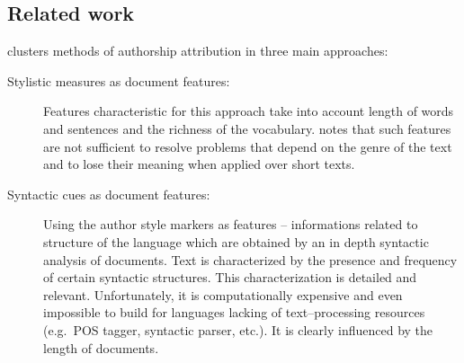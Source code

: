 \documentclass[11pt,english]{article}
\newcommand{\engl}[1]{(engl.~\emph{#1})}
\begin{document}
\begin{multicols}{2}
\section{Related work}
\citet{coyotl2006authorship} clusters methods of authorship attribution in
three main approaches:
\begin{description}
\item[Stylistic measures as document features:] Features characteristic for this
approach take into account length of words and sentences and the richness of the
vocabulary. \citet{coyotl2006authorship} notes that such features are not
sufficient to resolve problems that depend on the genre of the text and to lose
their meaning when applied over short texts.

\item[Syntactic cues as document features:] Using the author style markers as
features -- informations related to structure of the language which are obtained
by an in depth syntactic analysis of documents. Text is characterized by the
presence and frequency of certain syntactic structures. This characterization is
detailed and relevant. Unfortunately, it is computationally expensive and even
impossible to build for languages lacking of text--processing resources (e.g.\
POS tagger, syntactic parser, etc.). It is clearly influenced by the length of
documents.


\end{description}
\end{multicols}
\end{document}
